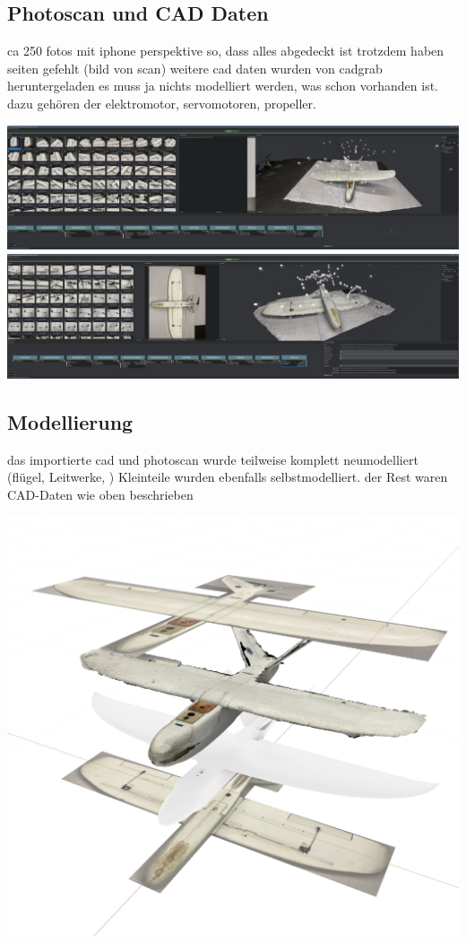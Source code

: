 \subsection{Photoscan und CAD Daten}

ca 250 fotos mit iphone
perspektive so, dass alles abgedeckt ist
trotzdem haben seiten gefehlt
(bild von scan)
weitere cad daten wurden von cadgrab heruntergeladen
es muss ja nichts modelliert werden, was schon vorhanden ist.
dazu gehören der elektromotor, servomotoren, propeller.

\includegraphics[width=\textwidth]{gfx/prod/plane/meshroom1.jpg}
\includegraphics[width=\textwidth]{gfx/prod/plane/meshroom2.jpg}


\subsection{Modellierung}

das importierte cad und photoscan wurde teilweise komplett neumodelliert (flügel, Leitwerke, )
Kleinteile wurden ebenfalls selbstmodelliert.
der Rest waren CAD-Daten wie oben beschrieben

\includegraphics[width=\textwidth]{gfx/prod/plane/plane5.jpg}
